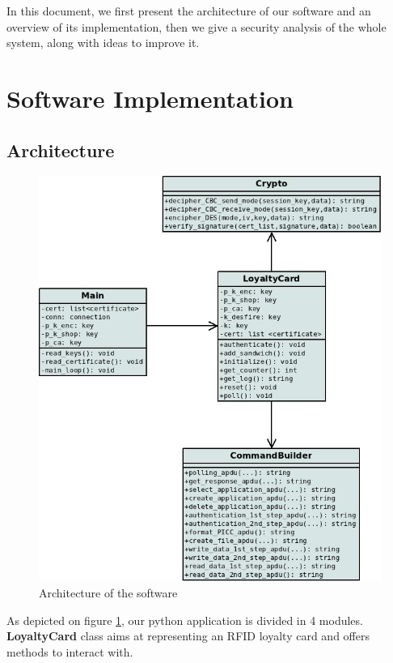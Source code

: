 \documentclass[a4paper,11pt,oneside]{article}
\begin{document}
In this document, we first present the architecture of our software and an overview of its implementation, then we give a security analysis of the whole system, along with ideas to improve it. \\


\section{Software Implementation}

\subsection{Architecture}

\begin{figure}[!ht]
	\centering
	\includegraphics[scale=0.50]{Images/ClassDiagram.jpg}
	\caption{Architecture of the software}
	\label{fig:class_diagram}	
\end{figure}


As depicted on figure \ref{fig:class_diagram}, our python application is divided
in 4 modules. \textbf{LoyaltyCard} class aims at representing an RFID loyalty
card and offers methods to interact with. 
\end{document}

